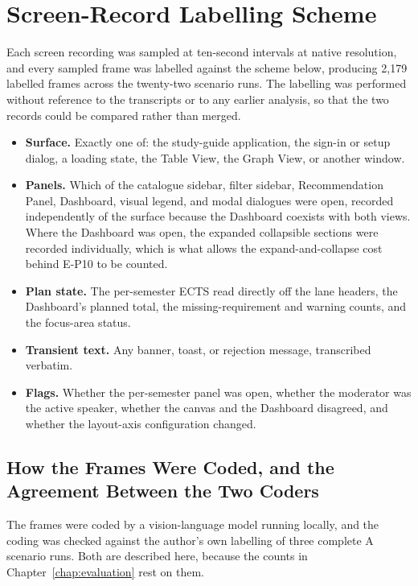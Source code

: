 \section{Screen-Record Labelling Scheme}
\label{app:eval-stagelog}
Each screen recording was sampled at ten-second intervals at native resolution, and every sampled frame was labelled against the scheme below, producing 2{,}179 labelled frames across the twenty-two scenario runs. The labelling was performed without reference to the transcripts or to any earlier analysis, so that the two records could be compared rather than merged.

\begin{itemize}
    \item \textbf{Surface.} Exactly one of: the study-guide application, the sign-in or setup dialog, a loading state, the Table View, the Graph View, or another window.
    \item \textbf{Panels.} Which of the catalogue sidebar, filter sidebar, Recommendation Panel, Dashboard, visual legend, and modal dialogues were open, recorded independently of the surface because the Dashboard coexists with both views. Where the Dashboard was open, the expanded collapsible sections were recorded individually, which is what allows the expand-and-collapse cost behind E-P10 to be counted.
    \item \textbf{Plan state.} The per-semester ECTS read directly off the lane headers, the Dashboard's planned total, the missing-requirement and warning counts, and the focus-area status.
    \item \textbf{Transient text.} Any banner, toast, or rejection message, transcribed verbatim.
    \item \textbf{Flags.} Whether the per-semester panel was open, whether the moderator was the active speaker, whether the canvas and the Dashboard disagreed, and whether the layout-axis configuration changed.
\end{itemize}

\subsection{How the Frames Were Coded, and the Agreement Between the Two Coders}
\label{app:eval-agreement}

The frames were coded by a vision-language model running locally, and the coding was checked against the author's own labelling of three complete A scenario runs. Both are described here, because the counts in Chapter~\ref{chap:evaluation} rest on them.

